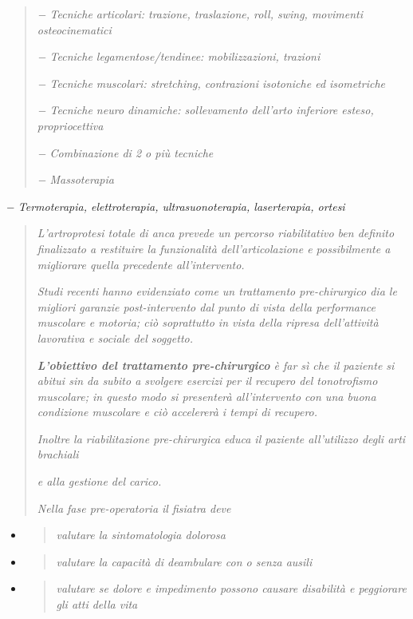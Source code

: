 \documentclass[]{article}
\begin{document}
\begin{quote}
\emph{− Tecniche articolari: trazione, traslazione, roll, swing,
movimenti osteocinematici}

\emph{− Tecniche legamentose/tendinee: mobilizzazioni, trazioni}

\emph{− Tecniche muscolari: stretching, contrazioni isotoniche ed
isometriche}

\emph{− Tecniche neuro dinamiche: sollevamento dell'arto inferiore
esteso, propriocettiva}

\emph{− Combinazione di 2 o più tecniche}

\emph{− Massoterapia}
\end{quote}

\emph{− Termoterapia, elettroterapia, ultrasuonoterapia, laserterapia,
ortesi}

\begin{quote}
\emph{L'artroprotesi totale di anca prevede un percorso riabilitativo
ben definito finalizzato a restituire la funzionalità dell'articolazione
e possibilmente a migliorare quella precedente all'intervento.}

\emph{Studi recenti hanno evidenziato come un trattamento pre-chirurgico
dia le migliori garanzie post-intervento dal punto di vista della
performance muscolare e motoria; ciò soprattutto in vista della ripresa
dell'attività lavorativa e sociale del soggetto.}

\emph{\textbf{L'obiettivo del trattamento pre-chirurgico} è far sì che
il paziente si abitui sin da subito a svolgere esercizi per il recupero
del tonotrofismo muscolare; in questo modo si presenterà all'intervento
con una buona condizione muscolare e ciò accelererà i tempi di
recupero.}

\emph{Inoltre la riabilitazione pre-chirurgica educa il paziente
all'utilizzo degli arti brachiali}

\emph{e alla gestione del carico.}

\emph{Nella \emph{fase pre-operatoria} il fisiatra deve}
\end{quote}

\begin{itemize}
\item
  \begin{quote}
  \emph{valutare la sintomatologia dolorosa}
  \end{quote}
\item
  \begin{quote}
  \emph{valutare la capacità di deambulare con o senza ausili}
  \end{quote}
\item
  \begin{quote}
  \emph{valutare se dolore e impedimento possono causare disabilità e
  peggiorare gli atti della vita}
  \end{quote}
\end{itemize}
\end{document}
